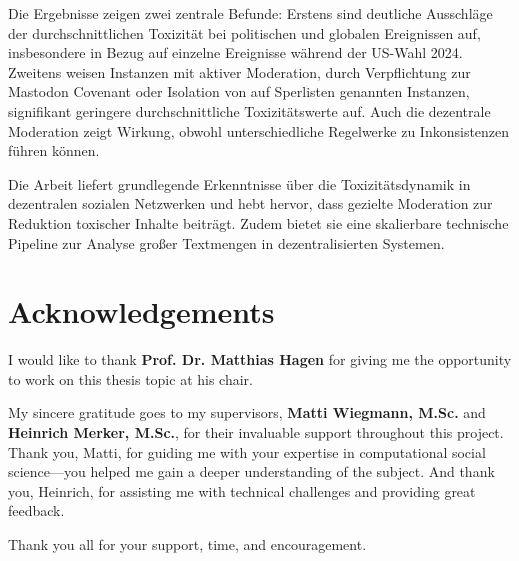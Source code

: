 \documentclass[english,bachelor,fsu]{webisthesis} %
\begin{document}
\begin{frontmatter}
Die Ergebnisse zeigen zwei zentrale Befunde: Erstens sind deutliche Ausschläge der durchschnittlichen Toxizität bei politischen und globalen Ereignissen auf, insbesondere in Bezug auf einzelne Ereignisse während der US-Wahl 2024. Zweitens weisen Instanzen mit aktiver Moderation, durch Verpflichtung zur Mastodon Covenant oder Isolation von auf Sperlisten genannten Instanzen, signifikant geringere durchschnittliche Toxizitätswerte auf. Auch die dezentrale Moderation zeigt Wirkung, obwohl unterschiedliche Regelwerke zu Inkonsistenzen führen können.

Die Arbeit liefert grundlegende Erkenntnisse über die Toxizitätsdynamik in dezentralen sozialen Netzwerken und hebt hervor, dass gezielte Moderation zur Reduktion toxischer Inhalte beiträgt. Zudem bietet sie eine skalierbare technische Pipeline zur Analyse großer Textmengen in dezentralisierten Systemen.

\tableofcontents

\chapter*{Acknowledgements}
I would like to thank \textbf{Prof. Dr. Matthias Hagen} for giving me the opportunity to work on this thesis topic at his chair.

My sincere gratitude goes to my supervisors, \textbf{Matti Wiegmann, M.Sc.} and \textbf{Heinrich Merker, M.Sc.}, for their invaluable support throughout this project. Thank you, Matti, for guiding me with your expertise in computational social science—you helped me gain a deeper understanding of the subject. And thank you, Heinrich, for assisting me with technical challenges and providing great feedback.

Thank you all for your support, time, and encouragement.




\end{frontmatter}









\printbibliography


\end{document}
